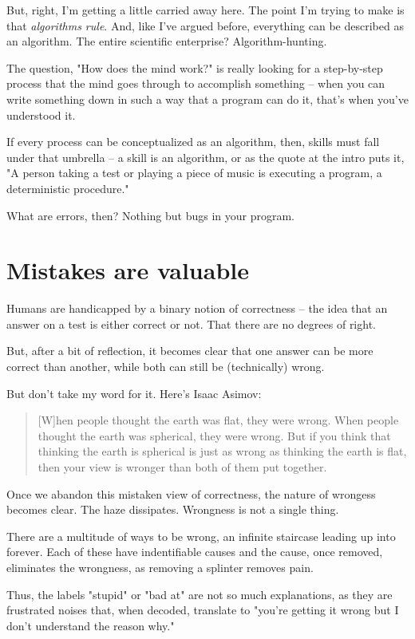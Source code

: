 But, right, I'm getting a little carried away here. The point I'm trying to make
is that \textit{algorithms rule}. And, like I've argued before, everything can be
described as an algorithm. The entire scientific enterprise? Algorithm-hunting.

The question, "How does the mind work?" is really looking for a step-by-step
process that the mind goes through to accomplish something -- when you can write
something down in such a way that a program can do it, that's when you've
understood it.

If every process can be conceptualized as an algorithm, then, skills must fall
under that umbrella -- a skill is an algorithm, or as the quote at the intro
puts it, "A person taking a test or playing a piece of music is executing a
program, a deterministic procedure."

What are errors, then? Nothing but bugs in your program.

\section{Mistakes are valuable}

Humans are handicapped by a binary notion of correctness -- the idea that an
answer on a test is either correct or not. That there are no degrees of right.

But, after a bit of reflection, it becomes clear that one answer can be more
correct than another, while both can still be (technically) wrong.

But don't take my word for it. Here's Isaac Asimov:

\begin{quote}
[W]hen people thought the earth was flat, they were wrong. When people thought
the earth was spherical, they were wrong. But if you think that thinking the
earth is spherical is just as wrong as thinking the earth is flat, then your
view is wronger than both of them put together.
\end{quote}
  
Once we abandon this mistaken view of correctness, the nature of
wrongess becomes clear. The haze dissipates. Wrongness is not a single thing.

There are a multitude of ways to be wrong, an infinite staircase leading up into
forever. Each of these have indentifiable causes and the cause, once removed, eliminates the
wrongness, as removing a splinter removes pain.

Thus, the labels "stupid" or "bad at" are not so much explanations, as
they are frustrated noises that, when decoded, translate to "you're getting it
wrong but I don't understand the reason why."

